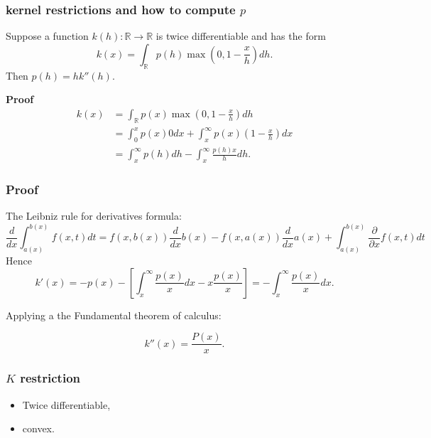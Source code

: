 \begin{frame}
    \frametitle{kernel restrictions and how to compute $p$}

    \begin{lemma}
        \label{eq:lema1}
        Suppose a function $k(h): \mathbb{R} \rightarrow \mathbb{R}$ is twice differentiable and has the form
        \begin{equation}
            k(x) = \int_{\mathbb{R}} p(h) \max \left(0, 1- \frac{x}{h}\right) dh.
        \end{equation}
        Then $p(h) = h k''(h)$.
    \end{lemma}
    \pause
 \textbf{Proof}
 \begin{align}
    k(x) &= 
    \int_{\mathbb{R}} p(x) \max \left(0, 1- \frac{x}{h}\right) dh
    \\ 
    & = 
    \int_{0}^x p(x) 0 dx
    + 
    \int_{x}^\infty
        p(x)
        \left(1- \frac{x}{h}\right) 
        d x
    \\
    &=
    \int_{x}^\infty
        p(h)
        dh
    -
    \int_{x}^\infty
        \frac{p(h) x}{h}
        d h. 
\end{align}
\end{frame}
\begin{frame}
    \frametitle{Proof}
    The Leibniz rule for derivatives formula:
   \begin{equation}
    \frac{d}{dx}\int_{a(x)}^{b(x)}f(x,t)dt=f(x,b(x))\frac{d}{dx}b(x)-f(x,a(x))\frac{d}{dx}a(x)+\int_{a(x)}^{b(x)}\frac{\partial}{\partial x}f(x,t)dt
   \end{equation}
    Hence
\begin{equation}
   k'(x)
   = 
   - p(x)
   - 
   \left[
    \int_{x}^\infty
            \frac{p(x)}{x}
            d x
    -
    x \frac{p(x)}{x}
   \right] 
   = - \int_{x}^\infty
   \frac{p(x)}{x}
   d x.
\end{equation}

    Applying a
    the Fundamental theorem of calculus: 

\begin{equation}
    k''(x)
    = 
    \frac{P(x)}{x}. 
\end{equation}

\end{frame}

\begin{frame}
    \frametitle{$K$ restriction}
    \begin{itemize}
        \item Twice differentiable,
        \item convex. 
    \end{itemize}

\end{frame}

